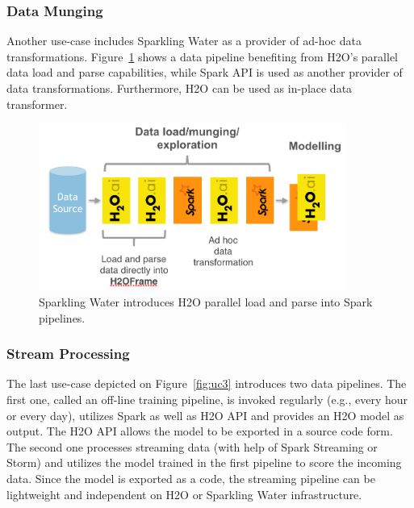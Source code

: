 \documentclass{standalone}
\begin{document}
\subsubsection{Data Munging}
Another use-case includes Sparkling Water as a provider of ad-hoc data transformations. Figure~\ref{fig:uc2} shows a data pipeline benefiting from H2O's parallel data load and parse capabilities, while Spark API is used as another provider of data transformations. Furthermore, H2O can be used as in-place data transformer.

\begin{figure}[h!]
	\centering
	\includegraphics[width=0.9\textwidth]{sw/images/uc2.png}
	\caption{Sparkling Water introduces H2O parallel load and parse into Spark pipelines.}
	\label{fig:uc2} 
\end{figure}

\subsubsection{Stream Processing}
The last use-case depicted on Figure~\ref{fig:uc3} introduces two data pipelines. The first one, called an off-line training pipeline, is invoked regularly (e.g., every hour or every day), utilizes Spark as well as H2O API and provides an H2O model as output. The H2O API allows the model to be exported in a source code form. The second one processes streaming data (with help of Spark Streaming or Storm) and utilizes the model trained in the first pipeline to score the incoming data. Since the model is exported as a code,  the streaming pipeline can be lightweight and independent on H2O or Sparkling Water infrastructure.
\end{document}
